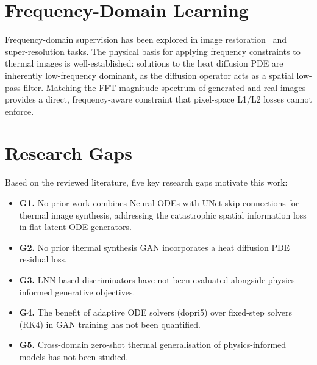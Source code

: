\section{Frequency-Domain Learning}

Frequency-domain supervision has been explored in image restoration~\cite{b_fft1} and super-resolution tasks. The physical basis for applying frequency constraints to thermal images is well-established: solutions to the heat diffusion PDE are inherently low-frequency dominant, as the diffusion operator acts as a spatial low-pass filter. Matching the FFT magnitude spectrum of generated and real images provides a direct, frequency-aware constraint that pixel-space L1/L2 losses cannot enforce.

\section{Research Gaps}

Based on the reviewed literature, five key research gaps motivate this work:

\begin{itemize}
    \item \textbf{G1.} No prior work combines Neural ODEs with UNet skip connections for thermal image synthesis, addressing the catastrophic spatial information loss in flat-latent ODE generators.
    \item \textbf{G2.} No prior thermal synthesis GAN incorporates a heat diffusion PDE residual loss.
    \item \textbf{G3.} LNN-based discriminators have not been evaluated alongside physics-informed generative objectives.
    \item \textbf{G4.} The benefit of adaptive ODE solvers (dopri5) over fixed-step solvers (RK4) in GAN training has not been quantified.
    \item \textbf{G5.} Cross-domain zero-shot thermal generalisation of physics-informed models has not been studied.
\end{itemize}